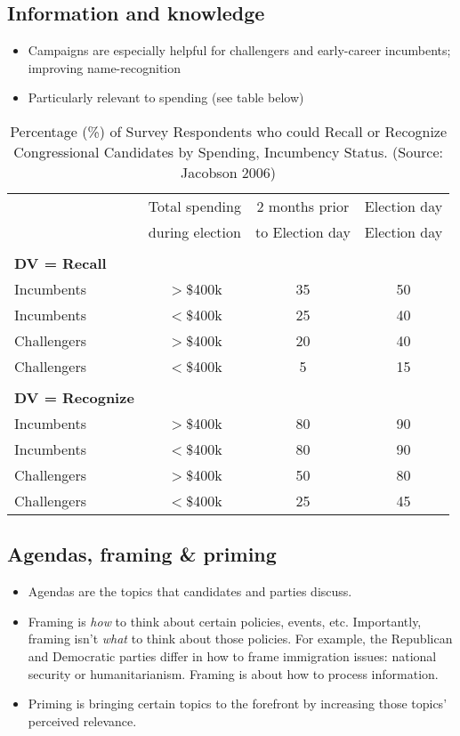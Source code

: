 \documentclass[10pt]{article}
\begin{document}
	\subsection{Information and knowledge}
	
	\begin{itemize}
		\item Campaigns are especially helpful for challengers and early-career incumbents; improving name-recognition
		\item Particularly relevant to spending (see table below)
	\end{itemize}
	
	
	\begin{table}[h]
		\centering
		\begin{tabular}{lccc}
			\toprule
			& Total spending  & 2 months prior & Election day \\ 
			& during election  & to Election day & Election day \\ \midrule
			\\[-.8em]
			\textbf{DV = Recall}\\
			Incumbents & $>$\$400k & 35 & 50\\
			Incumbents & $<$\$400k & 25 & 40 \\
			Challengers & $>$\$400k & 20 & 40 \\
			Challengers & $<$\$400k & 5 & 15 \\ \\
			\textbf{DV = Recognize} \\
			Incumbents & $>$\$400k & 80 & 90 \\
			Incumbents & $<$\$400k & 80 & 90 \\
			Challengers & $>$\$400k & 50 & 80\\ 
			Challengers & $<$\$400k & 25 & 45\\ \bottomrule
		\end{tabular}
		\caption{Percentage (\%) of Survey Respondents who could Recall or Recognize Congressional Candidates by Spending, Incumbency Status. (Source: Jacobson 2006)}
	\end{table}
	
	\subsection{Agendas, framing \& priming}
	\begin{itemize}
		\item Agendas are the topics that candidates and parties discuss.
		\item Framing is \textit{how} to think about certain policies, events, etc. Importantly, framing isn't \textit{what} to think about those policies. For example, the Republican and Democratic parties differ in how to frame immigration issues: national security or humanitarianism. Framing is about how to process information.
		\item Priming is bringing certain topics to the forefront by increasing those topics' perceived relevance.
	\end{itemize}
	
\end{document}
